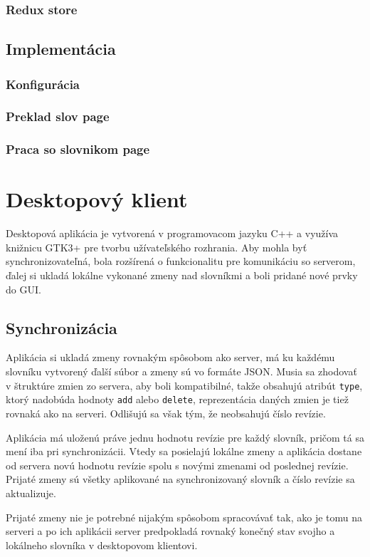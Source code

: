 \documentclass[
  digital, %
  table,   %
  lof,     %
  lot,     %
]{fithesis3}
\begin{document}
\subsection{Redux store}

\section{Implementácia}
\subsection{Konfigurácia}
\subsection{Preklad slov page}
\subsection{Praca so slovnikom page}

\chapter{Desktopový klient}
Desktopová aplikácia je vytvorená v programovacom jazyku C++ a využíva knižnicu GTK3+ pre tvorbu užívateľského rozhrania. Aby mohla byť synchronizovateľná, bola rozšírená o funkcionalitu pre komunikáciu so serverom, ďalej si ukladá lokálne vykonané zmeny nad slovníkmi a boli pridané nové prvky do GUI.

\section{Synchronizácia}
Aplikácia si ukladá zmeny rovnakým spôsobom ako server, má ku každému slovníku vytvorený ďalší súbor a zmeny sú vo formáte JSON. Musia sa zhodovať v štruktúre zmien zo servera, aby boli kompatibilné, takže obsahujú atribút \texttt{type}, ktorý nadobúda hodnoty \texttt{add} alebo \texttt{delete}, reprezentácia daných zmien je tiež rovnaká ako na serveri. Odlišujú sa však tým, že neobsahujú číslo revízie.

Aplikácia má uloženú práve jednu hodnotu revízie pre každý slovník, pričom tá sa mení iba pri synchronizácii. Vtedy sa posielajú lokálne zmeny a aplikácia dostane od servera novú hodnotu revízie spolu s novými zmenami od poslednej revízie. Prijaté zmeny sú všetky aplikované na synchronizovaný slovník a číslo revízie sa aktualizuje.

Prijaté zmeny nie je potrebné nijakým spôsobom spracovávať tak, ako je tomu na serveri a po ich aplikácii server predpokladá rovnaký konečný stav svojho a lokálneho slovníka v desktopovom klientovi.
\end{document}
